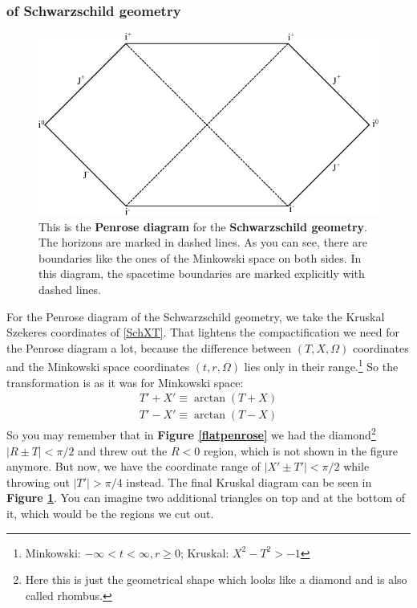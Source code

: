 	\subsubsection{of Schwarzschild geometry \checkmark}

	\begin{figure}[tbp]  	
	  	\begin{center}
		\includegraphics[scale=0.85]{schpenrose}
		\end{center}
		\caption{This is the \textbf{Penrose diagram} for the \textbf{Schwarzschild geometry}. The horizons are marked in dashed lines. As you can see, there are boundaries like the ones of the Minkowski space on both sides. In this diagram, the spacetime boundaries are marked explicitly with dashed lines. } \label{schpenrose}
	\end{figure}
	For the Penrose diagram of the Schwarzschild geometry, we take the Kruskal Szekeres coordinates of \eqref{SchXT}. That lightens the compactification we need for the Penrose diagram a lot, because the difference between $(T,X,\Omega)$ coordinates and the Minkowski space coordinates $(t,r,\Omega)$ lies only in their range.\footnote{Minkowski: $-\infty < t < \infty, r\geq 0$; Kruskal: $X^2-T^2 > -1$}
	So the transformation is as it was for Minkowski space:
		\begin{equation}
			\begin{split}
			T'+X'\equiv \arctan(T+X) \\
			T'-X'\equiv \arctan(T-X)
			\end{split}		
		\end{equation}
	So you may remember that in \textbf{Figure \ref{flatpenrose}} we had the diamond\footnote{Here this is just the geometrical shape which looks like a diamond and is also called rhombus.} $|R \pm T| < \pi/2$ and threw out the $R < 0$ region, which is not shown in the figure anymore.  But now, we have the coordinate range of $|X'\pm T'|< \pi/2$ while throwing out $|T'| > \pi/4$  instead. The final Kruskal diagram can be seen in \textbf{Figure \ref{schpenrose}}. You can imagine two additional triangles on top and at the bottom of it, which would be the regions we cut out.
	\FloatBarrier